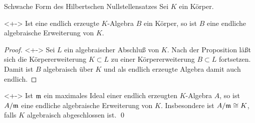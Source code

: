 \begin{frame}{Schwache Form des Hilbertschen Nullstellensatzes}
	Sei \(K\) ein Körper.
	\begin{corollary}<+->
		\label{cor:weak_hilbert1}
		Ist eine endlich erzeugte \(K\)-Algebra \(B\) ein Körper, so ist \(B\)
		eine endliche algebraische Erweiterung von \(K\).
	\end{corollary}
	\begin{proof}<+->
		Sei \(L\) ein algebraischer Abschluß von \(K\). Nach der Proposition
		läßt sich die Körpererweiterung \(K \subset L\) zu einer
		Körpererweiterung \(B \subset L\) fortsetzen. Damit ist \(B\)
		algebraisch über \(K\) und als endlich erzeugte Algebra damit auch
		endlich.
	\end{proof}
	\begin{corollary}<+->
		Ist \(\mathfrak{m}\) ein maximales Ideal einer endlich erzeugten
		\(K\)-Algebra \(A\), so ist \(A/\mathfrak{m}\)
		eine endliche algebraische Erweiterung von \(K\). Insbesondere
		ist \(A/\mathfrak{m} \cong K\), falls \(K\) algebraisch abgeschlossen ist.
		\qed
	\end{corollary}
\end{frame}

